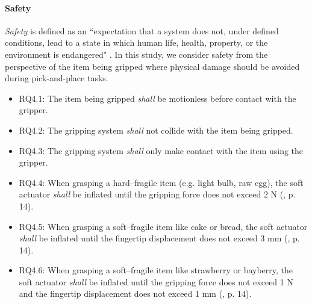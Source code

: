 \documentclass[lettersize,journal]{IEEEtran}
\begin{document}
\paragraph{Safety}\label{safety}
\emph{Safety} is defined as an ``expectation that a system does not, under defined conditions, lead to a state in which human life, health, property, or the environment is endangered" \cite{ISO24765:2017}. 
In this study, we consider safety from the perspective of the item being gripped where physical damage should be avoided during pick-and-place tasks. %
\begin{itemize}
	\item RQ4.1: The item being gripped \emph{shall} be motionless before contact with the gripper. 
	\item RQ4.2: The gripping system \emph{shall} not collide with the item being gripped. 
	\item RQ4.3: The gripping system \emph{shall} only make contact with the item using the gripper.
	\item RQ4.4: When grasping a hard–fragile item (e.g. light bulb, raw egg), the soft actuator \emph{shall} be inflated until the gripping force does not exceed 2 N (\cite{Cheng2021}, p. 14).
	\item RQ4.5: When grasping a soft–fragile item like cake or bread, the soft actuator \emph{shall} be inflated until the fingertip displacement does not exceed 3 mm (\cite{Cheng2021}, p. 14).
	\item RQ4.6: When grasping a soft–fragile item like strawberry or bayberry, the soft actuator \emph{shall} be inflated until the gripping force does not exceed 1 N and the fingertip displacement does not exceed 1 mm (\cite{Cheng2021}, p. 14).
\end{itemize}
\end{document}
